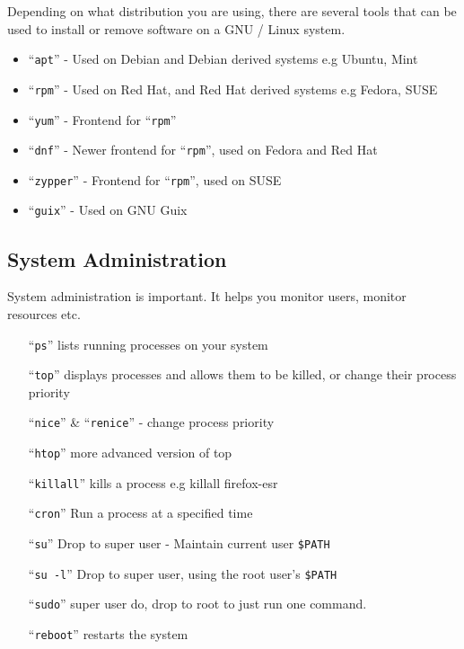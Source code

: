 \documentclass{book}
\begin{document}
Depending on what distribution you are using, there are several tools that can be used to install or remove software on a GNU / Linux system.

\begin{itemize}
\item ``\verb|apt|'' - Used on Debian and Debian derived systems e.g Ubuntu, Mint
\item ``\verb|rpm|'' - Used on Red Hat, and Red Hat derived systems e.g Fedora, SUSE
\item ``\verb|yum|'' - Frontend for ``\verb|rpm|''
\item ``\verb|dnf|'' - Newer frontend for ``\verb|rpm|'', used on Fedora and Red Hat
\item ``\verb|zypper|'' - Frontend for ``\verb|rpm|'', used on SUSE
\item ``\verb|guix|'' - Used on GNU Guix
\end{itemize}

\subsection{System Administration}

System administration is important. It helps you monitor users, monitor resources etc.
\begin{itemize}
\item[``\texttt{ps}''] lists running processes on your system
\item[``\texttt{top}''] displays processes and allows them to be killed, or change their process priority
\item[``\texttt{nice}'' \& ``\texttt{renice}''] - change process priority
\item[``\texttt{htop}''] more advanced version of top
\item[``\texttt{killall}''] kills a process e.g killall firefox-esr
\item[``\texttt{cron}''] Run a process at a specified time
\item[``\texttt{su}''] Drop to super user - Maintain current user \verb|$PATH|
\item[``\texttt{su -l}''] Drop to super user, using the root user's \verb|$PATH|
\item[``\texttt{sudo}''] super user do, drop to root to just run one command.
\item[``\texttt{reboot}''] restarts the system
\end{itemize}
\end{document}

